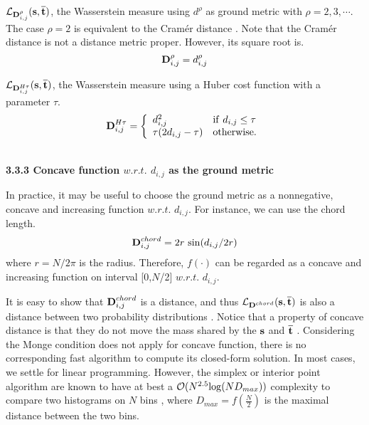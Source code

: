 $\mathcal{L}_{{\rm\textbf{D}}_{i,j}^\rho}{(\rm{{\textbf{s},\overline{\textbf{t}}}})}$, the Wasserstein measure using $d^\rho$ as ground metric with $\rho=2,3,\cdots$. The case $\rho=2$ is equivalent to the Cram\'{e}r distance \cite{rizzo2016energy}. Note that the Cram\'{e}r distance is not a distance metric proper. However, its square root is.\begin{equation}
{\rm\textbf{D}}_{i,j}^\rho= d_{i,j}^\rho    
\end{equation} 



\vspace{-3pt}
$\mathcal{L}_{{\rm\textbf{D}}_{i,j}^{H\tau}}{(\rm{{\textbf{s},\overline{\textbf{t}}}})}$, the Wasserstein measure using a Huber cost function with a parameter $\tau$.\begin{equation}
{\rm\textbf{D}}_{i,j}^{H\tau}=\left\{
             \begin{array}{ll}
             d_{i,j}^2&{\rm{if}}~d_{i,j}\leq\tau\\
             \tau(2d_{i,j}-\tau)&{\rm{otherwise}}.\\
             \end{array}
             \right.
\end{equation}










~\\
\noindent\textbf{3.3.3 Concave function $w.r.t.$ $d_{i,j}$ as the ground metric}


In practice, it may be useful to choose the ground metric as a nonnegative, concave and increasing function $w.r.t.$ $d_{i,j}$. For instance, we can use the chord length. \begin{equation}
{\rm\textbf{D}}_{i,j}^{chord}=2r~{\rm sin}(d_{i,j}/2r)
\end{equation}where $r=N/2\pi$ is the radius. Therefore, $f(\cdot)$ can be regarded as a concave and increasing function on interval [0,$N$/2] $w.r.t.$ $d_{i,j}$.


It is easy to show that ${\rm\textbf{D}}_{i,j}^{chord}$ is a distance, and thus $\mathcal{L}_{{\rm\textbf{D}}^{chord}}(\rm{\textbf{s},\overline{\textbf{t}}})$ is also a distance between two probability distributions \cite{villani2003topics}. Notice that a property of concave distance is that they do not move the mass shared by the $\rm{\textbf{s}}$ and ${\rm\overline{\textbf{t}}}$ \cite{villani2003topics}. Considering the Monge condition does not apply for concave function, there is no corresponding fast algorithm to compute its closed-form solution. In most cases, we settle for linear programming. However, the simplex or interior point algorithm are known to have at best a $\mathcal{O}(N^{2.5}{\rm{log}}(ND_{max}))$ complexity to compare two histograms on $N$ bins \cite{orlin1993faster,burkard2009society}, where $D_{max}=f(\frac{N}{2})$ is the maximal distance between the two bins.   


